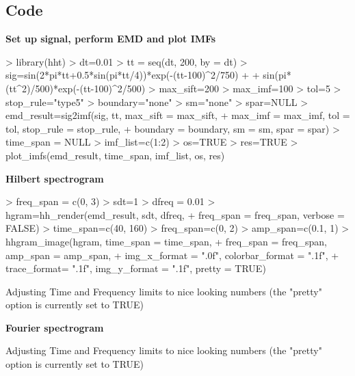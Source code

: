 \documentclass[12pt]{article}
\begin{document}
\subsection{Code}

\textbf{Set up signal, perform EMD and plot IMFs}
\begin{Schunk}
\begin{Sinput}
> library(hht)
> dt=0.01
> tt = seq(dt, 200, by = dt)
> sig=sin(2*pi*tt+0.5*sin(pi*tt/4))*exp(-(tt-100)^2/750) + 
+     sin(pi*(tt^2)/500)*exp(-(tt-100)^2/500)
> max_sift=200
> max_imf=100
> tol=5
> stop_rule="type5"
> boundary="none"
> sm="none"
> spar=NULL
> emd_result=sig2imf(sig, tt, max_sift = max_sift,
+     max_imf = max_imf, tol = tol, stop_rule = stop_rule,
+     boundary = boundary, sm = sm, spar = spar)
> time_span = NULL
> imf_list=c(1:2)
> os=TRUE
> res=TRUE
> plot_imfs(emd_result, time_span, imf_list, os, res)
\end{Sinput}
\end{Schunk}

\textbf{Hilbert spectrogram}

\begin{Schunk}
\begin{Sinput}
> freq_span = c(0, 3)
> sdt=1
> dfreq = 0.01
> hgram=hh_render(emd_result, sdt, dfreq, 
+     freq_span = freq_span, verbose = FALSE)
> time_span=c(40, 160)
> freq_span=c(0, 2)
> amp_span=c(0.1, 1)
> hhgram_image(hgram, time_span = time_span, 
+     freq_span = freq_span, amp_span = amp_span,
+     img_x_format = ".0f", colorbar_format = ".1f", 
+     trace_format= ".1f", img_y_format = ".1f", pretty = TRUE)
\end{Sinput}
\begin{Soutput}
Adjusting Time and Frequency limits to nice looking numbers (the "pretty" option is currently set to TRUE)
\end{Soutput}
\end{Schunk}

\textbf{Fourier spectrogram}
\begin{Schunk}
\begin{Soutput}
Adjusting Time and Frequency limits to nice looking numbers (the "pretty" option is currently set to TRUE)
\end{Soutput}
\end{Schunk}
\end{document}
